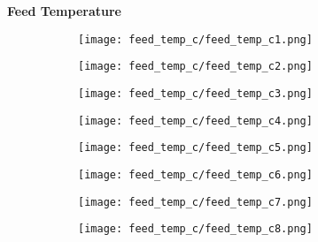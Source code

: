 \documentclass{article}
\begin{document}
    \textbf{Feed Temperature}
    \begin{figure}[H]
        \centering
        \begin{subfigure}{0.48\linewidth}
		    \texttt{[image: feed\_temp\_c/feed\_temp\_c1.png]}
	    \end{subfigure}
	    \begin{subfigure}{0.48\linewidth}
		    \texttt{[image: feed\_temp\_c/feed\_temp\_c2.png]}
	    \end{subfigure}
	    \begin{subfigure}{0.48\linewidth}
		    \texttt{[image: feed\_temp\_c/feed\_temp\_c3.png]}
	    \end{subfigure}
	    \begin{subfigure}{0.48\linewidth}
		    \texttt{[image: feed\_temp\_c/feed\_temp\_c4.png]}
	    \end{subfigure}
	    \begin{subfigure}{0.48\linewidth}
		    \texttt{[image: feed\_temp\_c/feed\_temp\_c5.png]}
	    \end{subfigure}
	    \begin{subfigure}{0.48\linewidth}
		    \texttt{[image: feed\_temp\_c/feed\_temp\_c6.png]}
	    \end{subfigure}
	    \begin{subfigure}{0.48\linewidth}
		    \texttt{[image: feed\_temp\_c/feed\_temp\_c7.png]}
	    \end{subfigure}
	    \begin{subfigure}{0.48\linewidth}
		    \texttt{[image: feed\_temp\_c/feed\_temp\_c8.png]}
	    \end{subfigure}
    \end{figure}
    
    \pagebreak
    
\end{document}
